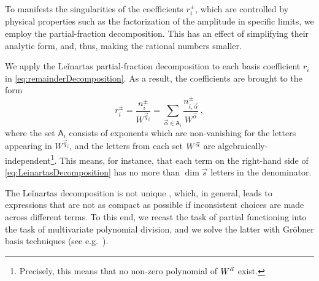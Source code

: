 To manifests the singularities
of the coefficients $r_i^\pm$, which are controlled by physical properties such
as the factorization of the amplitude in specific limits,
we employ the partial-fraction decomposition. 
This has an effect of simplifying their analytic form,
and, thus, making the rational numbers smaller.

We apply the Leǐnartas partial-fraction decomposition \cite{leinartas1978factorization,raichev2012leinartas,Smirnov:2005ky}
to each basis coefficient $r_i$ in \cref{eq:remainderDecomposition}.
As a result, the coefficients are brought to the form
\begin{equation}
    r_i^{\pm} = \frac{n_i^\pm }{W^{\vec q_i} } = \sum_{\vec\alpha \in \mathsf{A}_{i}} \frac{n^{\pm}_{i,\vec\alpha}}{ W^{\vec\alpha} }\,,
    \label{eq:LeinartasDecomposition}
\end{equation}
where the set $\mathsf{A}_{i}$ consists of exponents which are non-vanishing for the letters appearing 
in $W^{\vec q_i}$, and the letters from each set $W^{\va{\alpha}}$ are algebraically-independent\footnote{
 Precisely, this means that no non-zero polynomial of $W^{\va{\alpha}}$ exist.
}. 
This means, for instance, that each term on the right-hand side of \cref{eq:LeinartasDecomposition} 
has no more than $\dim{\vec s}$ letters in the denominator.

The Leǐnartas decomposition is not unique \cite{raichev2012leinartas},
which, in general, leads to expressions that are not as compact as possible if inconsistent choices
are made across different terms.
To this end, we recast the task of partial functioning into the task of multivariate polynomial division,
and we solve the latter with Gröbner basis techniques (see e.g.\ \cite{cox2013ideals}).

